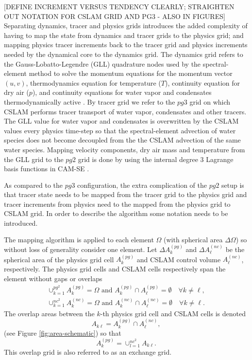 [DEFINE INCREMENT VERSUS TENDENCY CLEARLY; STRAIGHTEN OUT NOTATION FOR CSLAM GRID AND PG3 - ALSO IN FIGURES]\\

Separating dynamics, tracer and physics grids introduces the added complexity of having to map the state from dynamics and tracer grids to the physics grid; and mapping physics tracer increments back to the tracer grid and physics increments needed by the dynamical core to the dynamics grid. The dynamics grid refers to the Gauss-Lobatto-Legendre (GLL) quadrature nodes used by the spectral-element method to solve the momentum equations for the momentum vector $(u,v)$, thermodynamics equation for temperature ($T$), continuity equation for dry air ($p$), and continuity equations for water vapor and condensates thermodynamically active \citep[see, e.g., ][ for details]{LetAl2018JAMES}. By tracer grid we refer to the $pg3$ grid on which CSLAM performs tracer transport of water vapor, condensates and other tracers. The GLL value for water vapor and condensates is overwritten by the CSLAM values every physics time-step so that the spectral-element advection of water species does not become decoupled from the the CSLAM advection of the same water species. Mapping velocity components, dry air mass and temperature from the GLL grid to the $pg2$ grid is done by using the internal degree 3 Lagrange basis functions in CAM-SE \citep[as described in  ][ for pg3; exactly the same methods can be used for $pg2$]{HL2018MWR}.

As compared to the $pg3$ configuration, the extra complication of the $pg2$ setup is that tracer state needs to be mapped from the tracer grid to the physics grid and tracer increments from physics need to the mapped from the physics grid to CSLAM grid. In order to describe the algorithm some notation needs to be introduced.

The mapping algorithm is applied to each element $\Omega$ (with spherical area $\Delta \Omega$) so without loss of generality consider one element. Let $\Delta A^{(pg)}_k$ and $\Delta A^{(nc)}_\ell$ be the spherical area of the physics grid cell $A^{(pg)}_k$ and CSLAM control volume $A^{(nc)}_\ell$, respectively. The physics grid cells and CSLAM cells respectively span the element without gaps or overlaps
\begin{eqnarray}
\cup_{k=1}^{pg^2}A^{(pg)}_k=\Omega \text{ and } A^{(pg)}_k \cap A^{(pg)}_\ell = \emptyset \quad \forall k\ne \ell,\\
\cup_{k=1}^{nc^2}A^{(nc)}_k=\Omega \text{ and } A^{(nc)}_k \cap A^{(nc)}_\ell = \emptyset \quad \forall k\ne \ell.
\end{eqnarray}
The overlap areas between the $k$-th physics grid cell and CSLAM cells is denoted
\begin{equation}
A_{k\ell}=A^{(pg)}_k \cap A^{(nc)}_\ell,
\end{equation}
(see Figure \ref{fig:area-schematic}) so that
\begin{equation}
A^{(pg)}_k=\cup_{l=1}^{nc^2}A_{k\ell}.
\end{equation}
This overlap grid is also referred to as an exchange grid.

